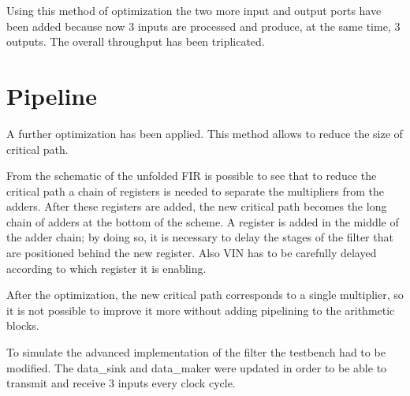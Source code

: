 Using this method of optimization the two more input and output ports have been added because
now 3 inputs are processed and produce, at the same time, 3 outputs. The overall throughput has
been triplicated.


\section{Pipeline}

A further optimization has been applied. This method allows to reduce the size of critical path.

From the schematic of the unfolded FIR is possible to see that to reduce the critical path a chain of registers
is needed to separate the multipliers from the adders. After these registers are added, the new critical path 
becomes the long chain of adders at the bottom of the scheme.
A register is added in the middle of the adder chain; by doing so, it is necessary to delay the stages of the filter
that are positioned behind the new register. Also VIN has to be carefully delayed according to which register it is enabling.

After the optimization, the new critical path corresponds to a single multiplier, so it is not possible to improve it more
without adding pipelining to the arithmetic blocks.

To simulate the advanced implementation of the filter the testbench had to be modified. The data\_sink and data\_maker were
updated in order to be able to transmit and receive 3 inputs every clock cycle.

